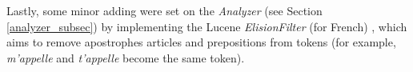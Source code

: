 Lastly, some minor adding were set on the \textit{Analyzer} (see Section \ref{analyzer_subsec}) by implementing the Lucene \textit{ElisionFilter} (for French) \cite{luceneelisionfilter}, which aims to remove apostrophes articles and prepositions from tokens (for example, \textit{m'appelle} and \textit{t'appelle} become the same token).




